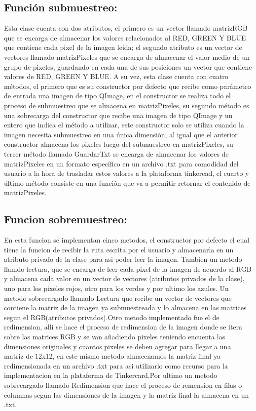 \documentclass{article}
\begin{document}
\subsection{Función submuestreo: }
Esta clase cuenta con dos atributos, el primero es un vector llamado matrizRGB que se encarga de almacenar los valores relacionados al RED, GREEN Y BLUE  que contiene cada pixel de la imagen leida; el segundo atributo es un vector de vectores llamado matrizPixeles que se encarga de almacenar el valor medio de un grupo de pixeles, guardando en cada una de sus posiciones un vector que contiene valores de RED, GREEN Y BLUE. A su vez, esta clase cuenta con cuatro métodos, el primero que es su constructor por defecto que recibe como parámetro de entrada una imagen de tipo QImage, en el constructor se realiza todo el proceso de submuestreo que se almacena en matrizPixeles, su segundo método es una sobrecarga del constructor que recibe una imagen de tipo QImage y un entero que indica el método a utilizar, este constructor solo se utiliza cuando la imagen necesita submuestreo en una única dimensión, al igual que el anterior constructor almacena los pixeles luego del submuestreo en matrizPixeles, su tercer método llamado GuardarTxt se encarga de almacenar los valores de matrizPixeles en un formato específico en un archivo .txt para comodidad del usuario a la hora de trasladar estos valores a la plataforma tinkercad, el cuarto y último método consiste en una función que va a permitir retornar el contenido de matrizPixeles.

\subsection{Funcion sobremuestreo:}
En esta funcion se implementan cinco metodos, el constructor por defecto el cual tiene la funcion de recibir la ruta escrita por el usuario y almacenarla en un atributo privado de la clase para asi poder leer la imagen. Tambien un metodo llamdo lectura, que se encarga de leer cada pixel de la imagen de acuerdo al RGB y almacena cada valor en un vector de vectores (atributos privados de la clase), uno para los pixeles rojos, otro para los verdes y por ultimo los azules. Un metodo sobrecargado llamado Lectura que recibe un vector de vectores que contiene la matriz de la imagen ya submuestreada y lo almacena en las matrices segun el RGB(atributos privados).Otro metodo implementado fue el de redimension, alli se hace el proceso de redimension de la imagen donde se itera sobre las matrices RGB y se van añadiendo pixeles teniendo encuenta las dimensiones originales y cuantos pixeles se deben agregar para llegar a una matriz de 12x12, en este mismo metodo almacenamos la matriz final ya redimensionada en un archivo .txt para asi utilizarlo como recurso para la implementacion en la plataforma de Tinkercard.Por ultimo un metodo sobrecargado llamado Redimension que hace el proceso de remension en filas o columnas segun las dimensiones de la imagen y la matriz final la almacena en un .txt.
\end{document}
